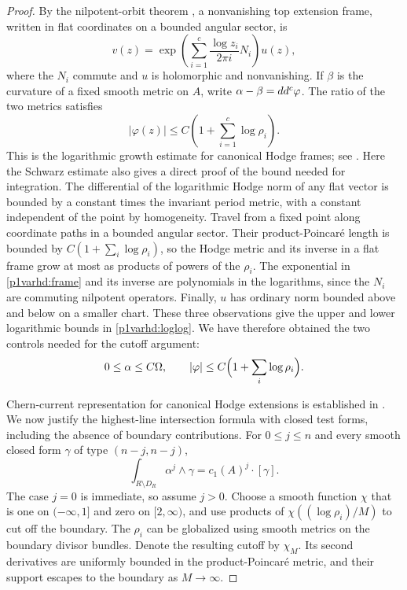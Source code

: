\begin{proof}
By the nilpotent-orbit theorem
\cite[Theorem~4.12]{Schmid}, a nonvanishing top extension frame,
written in flat coordinates on a bounded angular sector, is
\begin{equation}\label{p1varhd:frame}
 v(z)=\exp\left(\sum_{i=1}^{c}
               \frac{\log z_i}{2\pi i}N_i\right)u(z),
\end{equation}
where the $N_i$ commute and $u$ is holomorphic and nonvanishing.
If $\beta$ is the curvature of a fixed smooth metric on $A$, write
$\alpha-\beta=dd^c\varphi$.  The ratio of the two metrics satisfies
\begin{equation}\label{p1varhd:loglog}
 |\varphi(z)|\leq C\left(1+\sum_{i=1}^{c}\log\rho_i\right).
\end{equation}
This is the logarithmic growth estimate for canonical Hodge frames;
see \cite[Theorem~5.1]{CattaniKaplanDegenerating}.  Here the Schwarz
estimate also gives a direct proof of the bound needed for integration.  The differential of the logarithmic Hodge norm of any
flat vector is bounded by a constant times the invariant period
metric, with a constant independent of the point by homogeneity.
Travel from a fixed point along coordinate paths in a bounded
angular sector.  Their product-Poincar\'e length is bounded by
$C(1+\sum_i\log\rho_i)$, so the Hodge metric and its inverse in a
flat frame grow at most as products of powers of the $\rho_i$.
The exponential in \eqref{p1varhd:frame} and its inverse are polynomials
in the logarithms, since the $N_i$ are commuting nilpotent
operators.  Finally, $u$ has ordinary norm bounded above and below
on a smaller chart.  These three observations give the upper and
lower logarithmic bounds in \eqref{p1varhd:loglog}.  We have therefore
obtained the two controls needed for the cutoff argument:
\begin{equation}\label{p1logalt:metric-bounds}
 0\leq\alpha\leq C\Omega,
 \qquad |\varphi|\leq C\Bigl(1+\sum_i\log\rho_i\Bigr).
\end{equation}

Chern-current representation for canonical Hodge extensions is
established in \cite[Theorem~5.2]{CattaniKaplanDegenerating}. We now
justify the highest-line intersection formula with closed test forms,
including the absence of boundary contributions.  For $0\leq j\leq n$ and every
smooth closed form
$\gamma$ of type $(n-j,n-j)$,
\begin{equation}\label{p1varhd:chern}
 \int_{R\setminus D_R}\alpha^j\wedge\gamma
       =c_1(A)^j\cdot[\gamma].
\end{equation}
The case $j=0$ is immediate, so assume $j>0$.  Choose a smooth
function $\chi$ that is one on $(-\infty,1]$ and
zero on $[2,\infty)$, and use products of
$\chi((\log\rho_i)/M)$ to cut off the boundary.  The $\rho_i$ can
be globalized using smooth metrics on the boundary divisor
bundles.  Denote the resulting cutoff by $\chi_M$.  Its second
derivatives are uniformly bounded in the product-Poincar\'e metric,
and their support escapes to the boundary as $M\to\infty$.


\end{proof}
